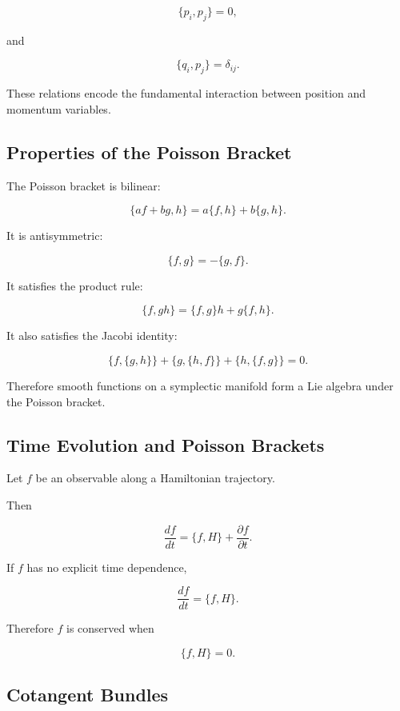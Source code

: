 \[
\boxed{
\{p_i,p_j\}=0,
}
\]

and

\[
\boxed{
\{q_i,p_j\}=\delta_{ij}.
}
\]

These relations encode the fundamental interaction between position and
momentum variables.

\subsection{Properties of the Poisson Bracket}
\label{subsec:poisson-bracket-properties}

The Poisson bracket is bilinear:

\[
\boxed{
\{af+bg,h\}
=
a\{f,h\}+b\{g,h\}.
}
\]

It is antisymmetric:

\[
\boxed{
\{f,g\}=-\{g,f\}.
}
\]

It satisfies the product rule:

\[
\boxed{
\{f,gh\}
=
\{f,g\}h+g\{f,h\}.
}
\]

It also satisfies the Jacobi identity:

\[
\boxed{
\{f,\{g,h\}\}
+
\{g,\{h,f\}\}
+
\{h,\{f,g\}\}
=
0.
}
\]

Therefore smooth functions on a symplectic manifold form a Lie algebra under
the Poisson bracket.

\subsection{Time Evolution and Poisson Brackets}
\label{subsec:time-evolution-poisson}

Let \(f\) be an observable along a Hamiltonian trajectory.

Then

\[
\boxed{
\frac{df}{dt}
=
\{f,H\}
+
\frac{\partial f}{\partial t}.
}
\]

If \(f\) has no explicit time dependence,

\[
\boxed{
\frac{df}{dt}
=
\{f,H\}.
}
\]

Therefore \(f\) is conserved when

\[
\boxed{
\{f,H\}=0.
}
\]

\subsection{Cotangent Bundles}
\label{subsec:symplectic-cotangent-bundles}

